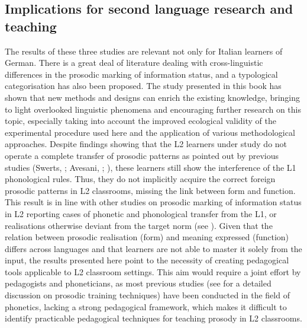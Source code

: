 \subsection{Implications  for second language research and teaching}
\hypertarget{Toc191305965}{}\begin{stylecaption}
\textup{The results of these three studies are relevant not only for Italian learners of German. There is a great deal of literature dealing with cross-linguistic differences in the prosodic marking of information status, and a typological categorisation has also been proposed. The study presented in this book has shown that new methods and designs can enrich the existing knowledge, bringing to light overlooked linguistic phenomena and encouraging further research on this topic, especially taking into account the improved ecological validity of the experimental procedure used here and the application of various methodological approaches. Despite findings showing that the L2 learners under study do not operate a complete transfer of prosodic patterns as pointed out by previous studies} \textup{(Swerts, \citealt{KrahmerAvesani2002}; Avesani, \citealt{BocciVayra2015}; \citealt{AvesaniEtAl2013})}\textup{, these learners still show the interference of the L1 phonological rules. Thus, they do not implicitly acquire the correct foreign prosodic patterns in L2 classrooms, missing the link between form and function. This result is in line with other studies on prosodic marking of information status in L2 reporting cases of phonetic and phonological transfer from the L1, or realisations otherwise deviant from the target norm (see ). Given that the relation between prosodic realisation (form) and meaning expressed (function) differs across languages and that learners are not able to master it solely from the input, the results presented here point to the necessity of creating pedagogical tools applicable to L2 classroom settings. This aim would require a joint effort by pedagogists and phoneticians, as most previous studies (see  for a detailed discussion on prosodic training techniques) have been conducted in the field of phonetics, lacking a strong pedagogical framework, which makes it difficult to identify practicable pedagogical techniques for teaching prosody in L2 classrooms.}
\end{stylecaption}

